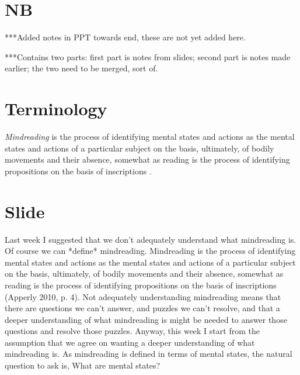 \documentclass[12pt,\papersize]{extarticle}
\begin{document}
\setlength\footnotesep{1em}




\maketitle
%
%
%



\section{NB}
***Added notes in PPT towards end, these are not yet added here.

***Contains two parts: first part is notes from slides; second part is notes made earlier; the two need to be merged, sort of.


\section{Terminology}


\textit{Mindreading} is 
	the process of 
	identifying mental states and actions 
	as the mental states and actions of a particular subject 
	on the basis, ultimately, of bodily movements and their absence,
somewhat as reading is the process of identifying propositions on the basis of inscriptions \citep[p.\ 4]{Apperly:2010kx}.


\section{Slide}
Last week I suggested that we don’t adequately understand what mindreading is.
Of course we can *define* mindreading.
Mindreading is the process of identifying mental states and actions as the mental states and actions of a particular subject on the basis, ultimately, of bodily movements and their absence, somewhat as reading is the process of identifying propositions on the basis of inscriptions (Apperly 2010, p. 4).
Not adequately understanding mindreading means that there are questions we can’t answer, and puzzles we can’t resolve, and that a deeper understanding of what mindreading is might be needed to answer those questions and resolve those puzzles.
Anyway, this week I start from the assumption that we agree on wanting a deeper understanding of what mindreading is.
As mindreading is defined in terms of mental states, the natural question to ask is,
What are mental states?
\end{document}
